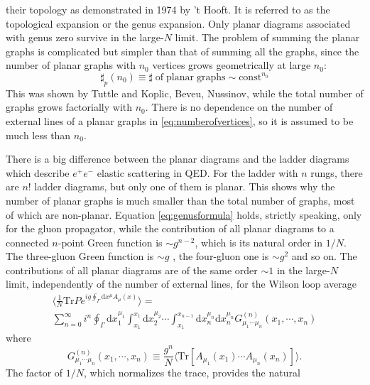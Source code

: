 their topology as demonstrated in 1974 by 't Hooft. It is referred to as the
topological expansion or the genus expansion. Only planar diagrams associated
with genus zero survive in the large-$N$ limit. The problem of summing the
planar graphs is complicated but simpler than that of summing all the graphs,
since the number of planar graphs with $n_0$ vertices grows geometrically at
large $n_0$:
\begin{equation}
  \sharp_p(n_0)\equiv\mathrm{\sharp\;of\;planar\;graphs}\sim\mathrm{const}^{n_0}
  \label{eq:numberofvertices}
\end{equation}
This was shown by Tuttle and Koplic, Beveu, Nussinov, while the total number of
graphs grows factorially with $n_0$. There is no dependence on the number of
external lines of a planar graphs in \eqref{eq:numberofvertices}, so it is
assumed to be much less than $n_0$.
\par There is a big difference between the planar diagrams and the ladder
diagrams which describe $e^+e^-$ elastic scattering in QED. For the ladder with
$n$ rungs, there are $n!$ ladder diagrams, but only one of them is planar. This
shows why the number of planar graphs is much smaller than the total number of
graphs, most of which are non-planar. Equation \eqref{eq:genusformula} holds,
strictly speaking, only for the gluon propagator, while the contribution of all
planar diagrams to a  connected $n$-point Green function is $\sim g^{n-2}$, 
which is its natural order in $1/N$. The three-gluon Green function is $\sim g$
, the four-gluon one is $\sim g^2$ and so on. The contributions of all 
planar diagrams are of the same order $\sim 1$ in the large-$N$ limit, 
independently of the number of external lines, for the Wilson loop average
\begin{multline}
  \big\langle\frac{1}{N}\mathrm{Tr}Pe^{ig\oint_\Gamma{\mathrm{d}x^\mu A_\mu
    (x)}}\big\rangle =\\
                     \sum_{n=0}^\infty i^n \oint_{\Gamma}\mathrm{d}x_1^{
      \mu_1}\int_{x_1}^{x_1}\mathrm{d}x_2^{\mu_2}\cdots\int_{x_1}^{x_{n-1}}\mathrm{d}x_n^{\mu_n}\mathrm{d}x_n^{\mu_n}G_{\mu_1\cdots\mu_n}^{(n)}(x_1,\cdots,x_n)
\end{multline}
where 
\begin{equation}
  G_{\mu_1\cdots\mu_n}^{(n)}(x_1,\cdots,x_n)\equiv\frac{g^n}{N}\langle\mathrm{Tr}\left[A_{\mu_1}(x_1)\cdots
    A_{\mu_n}(x_n)\right]\rangle.
    \label{eq:greeanfunctionlargen}
\end{equation}
The factor of $1/N$, which normalizes the trace, provides the natural
